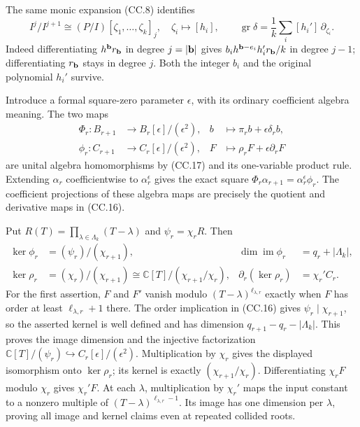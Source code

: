 The same monic expansion (CC.8) identifies
\[
 I^j/I^{j+1}\cong
 (P/I)[\zeta_1,\ldots,\zeta_k]_j,\quad
 \zeta_i\longmapsto[h_i],
 \qquad
 \operatorname{gr}\delta
 =\frac1k\sum_i[h_i']\,\partial_{\zeta_i}.
 \tag{CC.18}
\]
Indeed differentiating \(h^{\bf b}r_{\bf b}\) in degree \(j=|{\bf b}|\)
gives \(b_i h^{{\bf b}-e_i}h_i'r_{\bf b}/k\) in degree \(j-1\);
differentiating \(r_{\bf b}\) stays in degree \(j\).
Both the integer \(b_i\) and the original polynomial \(h_i'\) survive.

Introduce a formal square-zero parameter \(\epsilon\), with its
ordinary coefficient algebra meaning.  The two maps
\[
\begin{aligned}
 \Phi_r:B_{r+1}&\longrightarrow B_r[\epsilon]/(\epsilon^2),
 &b&\longmapsto\pi_rb+\epsilon\delta_rb,\\
 \phi_r:C_{r+1}&\longrightarrow C_r[\epsilon]/(\epsilon^2),
 &F&\longmapsto\rho_rF+\epsilon\partial_rF
\end{aligned}
\tag{CC.19}
\]
are unital algebra homomorphisms by (CC.17) and its one-variable
product rule.  Extending \(\alpha_r\) coefficientwise to
\(\alpha_r^\epsilon\) gives the exact square
\(\Phi_r\alpha_{r+1}=\alpha_r^\epsilon\phi_r\).
The coefficient projections of these algebra maps are precisely
the quotient and derivative maps in (CC.16).

Put \(R(T)=\prod_{\lambda\in\Lambda_k}(T-\lambda)\) and
\(\psi_r=\chi_rR\).  Then
\[
\begin{aligned}
 \ker\phi_r&=(\psi_r)/(\chi_{r+1}),&
 \dim\operatorname{im}\phi_r&=q_r+|\Lambda_k|,\\
 \ker\rho_r&=(\chi_r)/(\chi_{r+1})
       \cong\mathbb C[T]/(\chi_{r+1}/\chi_r),&
 \partial_r(\ker\rho_r)&=\chi_r'C_r .
\end{aligned}
\tag{CC.20}
\]
For the first assertion, \(F\) and \(F'\) vanish modulo
\((T-\lambda)^{\ell_{\lambda,r}}\) exactly when \(F\) has order
at least \(\ell_{\lambda,r}+1\) there.  The order implication in
(CC.16) gives \(\psi_r\mid\chi_{r+1}\), so the asserted kernel is
well defined and has dimension \(q_{r+1}-q_r-|\Lambda_k|\).
This proves the image dimension and the injective factorization
\(\mathbb C[T]/(\psi_r)\hookrightarrow C_r[\epsilon]/(\epsilon^2)\).
Multiplication by \(\chi_r\) gives the displayed isomorphism onto
\(\ker\rho_r\); its kernel is exactly \((\chi_{r+1}/\chi_r)\).
Differentiating \(\chi_rF\) modulo \(\chi_r\) gives \(\chi_r'F\).
At each \(\lambda\), multiplication by \(\chi_r'\) maps the input
constant to a nonzero multiple of
\((T-\lambda)^{\ell_{\lambda,r}-1}\).
Its image has one dimension per \(\lambda\), proving all image
and kernel claims even at repeated collided roots.

